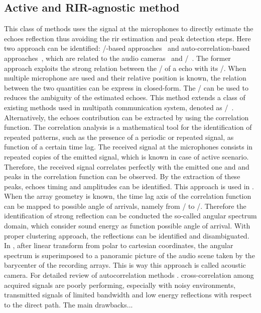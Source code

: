 \subsection{Active and RIR-agnostic method}
This class of methods uses the signal at the microphones to directly estimate the echoes reflection thus avoiding the rir estimation and peak detection steps.
Here two approach can be identified: \ML/-based approaches~ and auto-correlation-based approaches~, which are related to the audio cameras~ and \SSL/~.
The former approach exploits the strong relation between the \TOA/ of a echo with its \DOA/.
When multiple microphone are used and their relative position is known, the relation between the two quantities can be express in closed-form.
The \DOA/ can be used to reduces the ambiguity of the estimated echoes.
This method extends a class of existing methods used in multipath communication system, denoted as \JADE/~.
\\Alternatively, the echoes contribution can be extracted by using the correlation function.
The correlation analysis is a mathematical tool for the identification of repeated patterns, such as the presence of a periodic or repeated signal, as function of a certain time lag.
The received signal at the microphones consists in repeated copies of the emitted signal, which is known in case of active scenario.
Therefore, the received signal correlates perfectly with the emitted one and and peaks in the correlation function can be observed.
By the extraction of these peaks, echoes timing and amplitudes can be identified.
This approach is used in .
\\When the array geometry is known, the time lag axis of the correlation function can be mapped to possible angle of arrivals, namely from \TOAs/ to \DOAs/.
Therefore the identification of strong reflection can be conducted the so-called angular spectrum domain, which consider sound energy as function possible angle of arrival.
With proper clustering approach, the reflections can be identified and disambiguated.
In , after linear transform from polar to cartesian coordinates, the angular spectrum is superimposed to a panoramic picture of the audio scene taken by the barycenter of the recording arrays.
This is way this approach is called acoustic camera.
For detailed review of autocorrelation methods .
cross-correlation among acquired signals are poorly performing, especially with noisy environments, transmitted signals of limited bandwidth and low energy reflections with respect to the direct path.
The main drawbacks...


